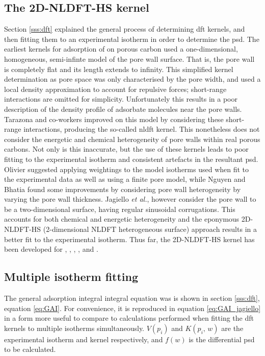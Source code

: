 \subsection{The 2D-NLDFT-HS kernel}
\label{ss:2d-nldft-hs}
Section \ref{sss:dft} explained the general process of determining \acrshort{dft} kernels, and then fitting them to an experimental isotherm in order to determine the \acrshort{psd}. The earliest kernels for \gls{adsorption} of  on porous carbon used a one-dimensional, homogeneous, semi-infinte model of the pore wall surface.\citep{seaton1989new} That is, the pore wall is completely flat and its length extends to infinity. This simplified kernel determination as pore space was only characterised by the pore width, and used a local density approximation to account for repulsive forces; short-range interactions are omitted for simplicity. Unfortunately this results in a poor description of the density profile of \gls{adsorbate} molecules near the pore walls. Tarazona and co-workers improved on this model by considering these short-range interactions, producing the so-called \acrfull{nldft} kernel.\citep{tarazona1985free, tarazona1987phase} This nonetheless does not consider the energetic and chemical heterogeneity of pore walls within real porous carbons. Not only is this inaccurate, but the use of these kernels leads to poor fitting to the experimental isotherm and consistent artefacts in the resultant \acrshort{psd}.\citep{Jagiello20132D,  olivier1998improving, lueking2009tests, nguyen2004characterization} Olivier suggested applying weightings to the model isotherms used when fit to the experimental data as well as using a finite pore model,\citep{olivier1998improving} while Nguyen and Bhatia found some improvements by considering pore wall heterogeneity by varying the pore wall thickness.\citep{nguyen2004characterization} Jagiello \textit{et al.}, however consider the pore wall to be a two-dimensional surface, having regular sinusoidal corrugations. This accounts for both chemical and energetic heterogeneity\citep{Jagiello20132D} and the eponymous 2D-NLDFT-HS (2-dimensional NLDFT heterogeneous surface) approach results in a better fit to the experimental isotherm.\citep{Jagiello20132D, puziy2016comparison, shi2021current} Thus far, the 2D-NLDFT-HS kernel has been developed for , , , , and .\citep{Jagiello20132D, Jagiello2013, jagiello2019consistency, Jagiello2020Exploiting}

\subsection{Multiple isotherm fitting}
\label{ss:multi_iso}
The general \gls{adsorption} integral integral equation was is shown in section \ref{sss:dft}, equation \ref{eq:GAI}. For convenience, it is reproduced in equation \ref{eq:GAI_jagiello} in a form more useful to compare to calculations performed when fitting the \acrshort{dft} kernels to multiple isotherms simultaneously. $V(p_i)$ and $K(p_i,\,w)$ are the experimental isotherm and kernel respectively, and $f(w)$ is the differential \acrshort{psd} to be calculated.

